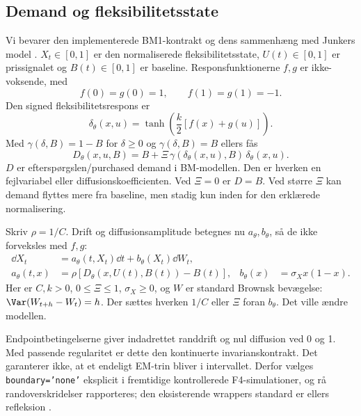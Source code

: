 \subsection{Demand og fleksibilitetsstate}
Vi bevarer den implementerede BM1-kontrakt og dens sammenhæng med Junkers model \cite{repo,junker}. \(X_t\in[0,1]\) er den normaliserede fleksibilitetsstate, \(U(t)\in[0,1]\) er prissignalet og \(B(t)\in[0,1]\) er baseline. Responsfunktionerne \(f,g\) er ikke-voksende, med
\begin{equation}
 f(0)=g(0)=1,\qquad f(1)=g(1)=-1.
 \label{eq:endpoints}
\end{equation}
Den signed fleksibilitetsrespons er
\begin{equation}
 \delta_\theta(x,u)=\tanh\!\left(\frac{k}{2}[f(x)+g(u)]\right).
 \label{eq:delta}
\end{equation}
Med \(\gamma(\delta,B)=1-B\) for \(\delta\geq0\) og \(\gamma(\delta,B)=B\) ellers fås
\begin{equation}
 D_\theta(x,u,B)=B+\Xi\,\gamma(\delta_\theta(x,u),B)\,\delta_\theta(x,u).
 \label{eq:demand}
\end{equation}
\(D\) er efterspørgslen/purchased demand i BM-modellen. Den er hverken en fejlvariabel eller diffusionskoefficienten. Ved \(\Xi=0\) er \(D=B\). Ved større \(\Xi\) kan demand flyttes mere fra baseline, men stadig kun inden for den erklærede normalisering.

Skriv \(\rho=1/C\). Drift og diffusionsamplitude betegnes nu \(a_\theta,b_\theta\), så de ikke forveksles med \(f,g\):
\begin{align}
 \dd X_t &= a_\theta(t,X_t)\dd t+b_\theta(X_t)\dd W_t,
 \label{eq:sde}\\
 a_\theta(t,x)&=\rho[D_\theta(x,U(t),B(t))-B(t)],
 &b_\theta(x)&=\sigma_Xx(1-x).
 \label{eq:coefficients}
\end{align}
Her er \(C,k>0\), \(0\leq\Xi\leq1\), \(\sigma_X\geq0\), og \(W\) er standard Brownsk bevægelse: \(\Var(W_{t+h}-W_t)=h\). Der sættes hverken \(1/C\) eller \(\Xi\) foran \(b_\theta\). Det ville ændre modellen.

Endpointbetingelserne giver indadrettet randdrift og nul diffusion ved 0 og 1. Med passende regularitet er dette den kontinuerte invarianskontrakt. Det garanterer ikke, at et endeligt EM-trin bliver i intervallet. Derfor vælges \texttt{boundary='none'} eksplicit i fremtidige kontrollerede F4-simulationer, og rå randoverskridelser rapporteres; den eksisterende wrappers standard er ellers refleksion \cite{repo}.

